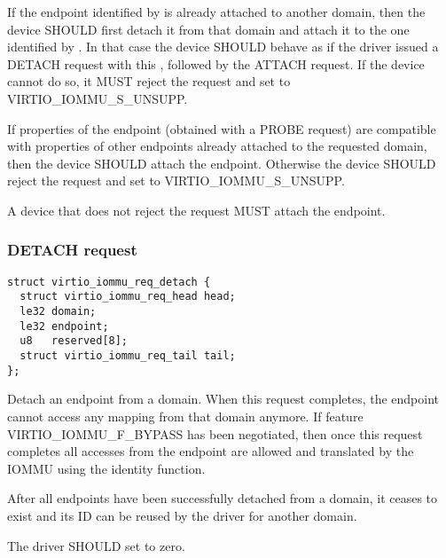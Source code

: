 If the endpoint identified by  is already attached to
another domain, then the device SHOULD first detach it from that domain
and attach it to the one identified by . In that case the
device SHOULD behave as if the driver issued a DETACH request with this
, followed by the ATTACH request. If the device cannot do
so, it MUST reject the request and set  to
VIRTIO_IOMMU_S_UNSUPP.

If properties of the endpoint (obtained with a PROBE request) are
compatible with properties of other endpoints already attached to the
requested domain, then the device SHOULD attach the endpoint. Otherwise
the device SHOULD reject the request and set  to
VIRTIO_IOMMU_S_UNSUPP.

A device that does not reject the request MUST attach the endpoint.

\subsubsection{DETACH request}

\begin{lstlisting}
struct virtio_iommu_req_detach {
  struct virtio_iommu_req_head head;
  le32 domain;
  le32 endpoint;
  u8   reserved[8];
  struct virtio_iommu_req_tail tail;
};
\end{lstlisting}

Detach an endpoint from a domain. When this request completes, the
endpoint cannot access any mapping from that domain anymore. If feature
VIRTIO_IOMMU_F_BYPASS has been negotiated, then once this request
completes all accesses from the endpoint are allowed and translated by the
IOMMU using the identity function.

After all endpoints have been successfully detached from a domain, it
ceases to exist and its ID can be reused by the driver for another domain.


The driver SHOULD set  to zero.


